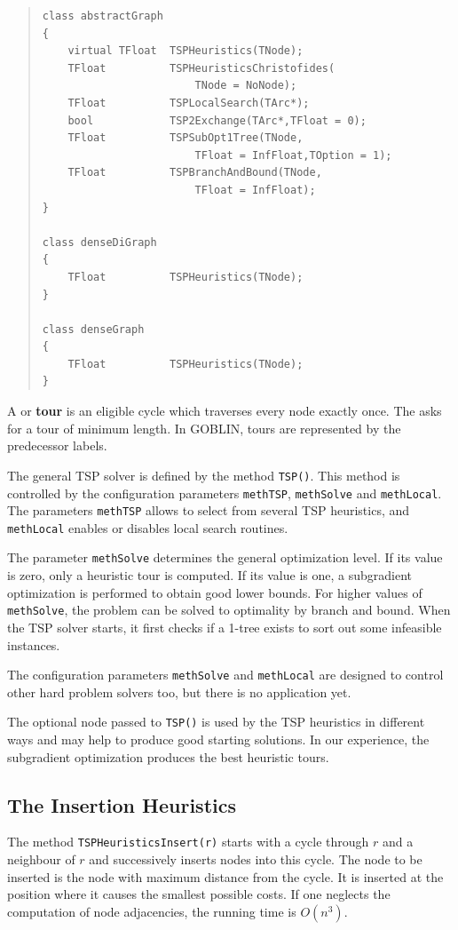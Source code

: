 \documentclass[a4paper,11pt,twoside]{book}
\begin{document}
\begin{multicols}{2}
\begin{quote}
\begin{verbatim}
class abstractGraph
{
    virtual TFloat  TSPHeuristics(TNode);
    TFloat          TSPHeuristicsChristofides(
                        TNode = NoNode);
    TFloat          TSPLocalSearch(TArc*);
    bool            TSP2Exchange(TArc*,TFloat = 0);
    TFloat          TSPSubOpt1Tree(TNode,
                        TFloat = InfFloat,TOption = 1);
    TFloat          TSPBranchAndBound(TNode,
                        TFloat = InfFloat);
}

class denseDiGraph
{
    TFloat          TSPHeuristics(TNode);
}

class denseGraph
{
    TFloat          TSPHeuristics(TNode);
}
\end{verbatim}
\end{quote}
A  or {\bf tour} is an eligible cycle which traverses
every node exactly once. The  asks for a
tour of minimum length. In GOBLIN, tours are represented by the predecessor
labels.

The general TSP solver is defined by the method \verb/TSP()/. This method is
controlled by the configuration parameters \verb/methTSP/, \verb/methSolve/
and \verb/methLocal/. The parameters \verb/methTSP/ allows to select from
several TSP heuristics, and \verb/methLocal/
enables or disables local search routines.
 
The parameter \verb/methSolve/ determines the general optimization
level. If its value is zero, only a heuristic tour is computed. If its value
is one, a subgradient optimization is performed to obtain good lower bounds.
For higher values of \verb/methSolve/, the problem can be solved to optimality
by branch and bound. When the TSP solver starts, it first checks if a 1-tree
exists to sort out some infeasible instances.

The configuration parameters \verb/methSolve/ and \verb/methLocal/ are designed
to control other hard problem solvers too, but there is no application yet.

The optional node passed to \verb/TSP()/ is used by the TSP heuristics in
different ways and may help to produce good starting solutions. In our
experience, the subgradient optimization produces the best heuristic tours.


\subsection{The Insertion Heuristics}
The method \verb/TSPHeuristicsInsert(r)/ starts with a cycle through $r$ 
and a neighbour of $r$ and successively inserts nodes into this cycle.
The node to be inserted is the node with maximum distance from the cycle.
It is inserted at the position where it causes the smallest possible costs.
If one neglects the computation of node adjacencies, the running time is
$O(n^3)$.



\end{multicols}
\end{document}
